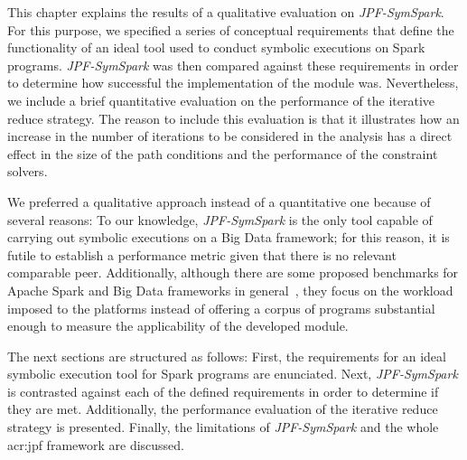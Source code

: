 
This chapter explains the results of a qualitative evaluation on \textit{JPF-SymSpark}. For this purpose, we specified a series of conceptual requirements that define the functionality of an ideal tool used to conduct symbolic executions on Spark programs. \textit{JPF-SymSpark} was then compared against these requirements in order to determine how successful the implementation of the module was. Nevertheless, we include a brief quantitative evaluation on the performance of the iterative reduce strategy. The reason to include this evaluation is that it illustrates how an increase in the number of iterations to be considered in the analysis has a direct effect in the size of the path conditions and the performance of the constraint solvers.

We preferred a qualitative approach instead of a quantitative one because of several reasons: To our knowledge, \textit{JPF-SymSpark} is the only tool capable of carrying out symbolic executions on a Big Data framework; for this reason, it is futile to establish a performance metric given that there is no relevant comparable peer. Additionally, although there are some proposed benchmarks for Apache Spark and Big Data frameworks in general~\cite{Li2015,Pavlo2009,Wang2014}, they focus on the workload imposed to the platforms instead of offering a corpus of programs substantial enough to measure the applicability of the developed module.

The next sections are structured as follows: First, the requirements for an ideal symbolic execution tool for Spark programs are enunciated. Next, \textit{JPF-SymSpark} is contrasted against each of the defined requirements in order to determine if they are met. Additionally, the performance evaluation of the iterative reduce strategy is presented. Finally, the limitations of \textit{JPF-SymSpark} and the whole \acrshort{acr:jpf} framework are discussed.



\label{sec:limitations}

%
%
%
%
%

